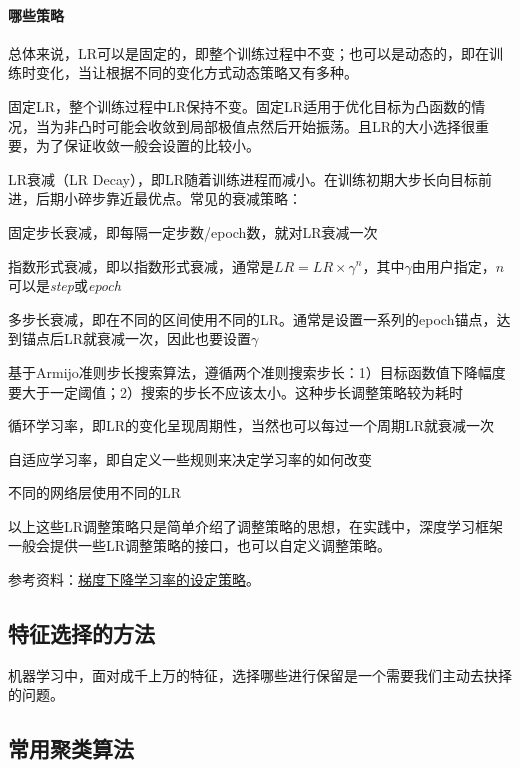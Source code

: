 \paragraph{哪些策略}总体来说，LR可以是固定的，即整个训练过程中不变；也可以是动态的，即在训练时变化，当让根据不同的变化方式动态策略又有多种。
\begin{myitemize}
	\item 固定LR，整个训练过程中LR保持不变。固定LR适用于优化目标为凸函数的情况，当为非凸时可能会收敛到局部极值点然后开始振荡。且LR的大小选择很重要，为了保证收敛一般会设置的比较小。
	\item LR衰减（LR Decay），即LR随着训练进程而减小。在训练初期大步长向目标前进，后期小碎步靠近最优点。常见的衰减策略：
	\begin{myitemize}
		\item 固定步长衰减，即每隔一定步数/epoch数，就对LR衰减一次
		\item 指数形式衰减，即以指数形式衰减，通常是$LR = LR \times \gamma^{n}$，其中$\gamma$由用户指定，$n$可以是\textit{step}或\textit{epoch}
		\item 多步长衰减，即在不同的区间使用不同的LR。通常是设置一系列的epoch锚点，达到锚点后LR就衰减一次，因此也要设置$\gamma$
	\end{myitemize}
	\item 基于Armijo准则步长搜索算法，遵循两个准则搜索步长：1）目标函数值下降幅度要大于一定阈值；2）搜索的步长不应该太小。这种步长调整策略较为耗时
	\item 循环学习率，即LR的变化呈现周期性，当然也可以每过一个周期LR就衰减一次
	\item 自适应学习率，即自定义一些规则来决定学习率的如何改变
	\item 不同的网络层使用不同的LR
\end{myitemize}
以上这些LR调整策略只是简单介绍了调整策略的思想，在实践中，深度学习框架一般会提供一些LR调整策略的接口，也可以自定义调整策略。

参考资料：\href{https://lumingdong.cn/setting-strategy-of-gradient-descent-learning-rate.html}{梯度下降学习率的设定策略}。

\subsection{特征选择的方法}
机器学习中，面对成千上万的特征，选择哪些进行保留是一个需要我们主动去抉择的问题。

\subsection{常用聚类算法}


